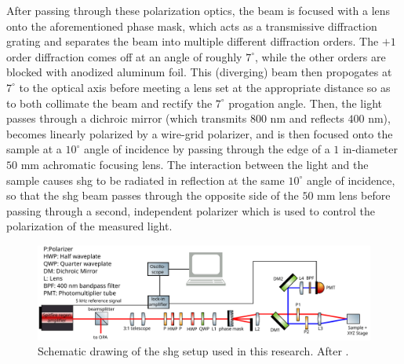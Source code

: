 After passing through these polarization optics, the beam is focused with a lens onto the aforementioned phase mask, which acts as a transmissive diffraction grating and separates the beam into multiple different diffraction orders.
The $+1$ order diffraction comes off at an angle of roughly $7^\circ$, while the other orders are blocked with anodized aluminum foil. 
This (diverging) beam then propogates at $7^\circ$ to the optical axis before meeting a lens set at the appropriate distance so as to both collimate the beam and rectify the $7^\circ$ progation angle.
Then, the light passes through a dichroic mirror (which transmits $800$ \si{nm} and reflects $400$ \si{nm}), becomes linearly polarized by a wire-grid polarizer, and is then focused onto the sample at a $10^\circ$ angle of incidence by passing through the edge of a $1$ \si{in}-diameter $50$ \si{mm} achromatic focusing lens.
The interaction between the light and the sample causes \gls{shg} to be radiated in reflection at the same $10^\circ$ angle of incidence, so that the \gls{shg} beam passes through the opposite side of the $50$ \si{mm} lens before passing through a second, independent polarizer which is used to control the polarization of the measured light.

\begin{figure}
\includegraphics[width=\textwidth]{gfx/ch3/pdf/setup.pdf}
\caption{\label{fig:setup}Schematic drawing of the \gls{shg} setup used in this research. After \citet{morey_automated_2024}.}
\end{figure}

